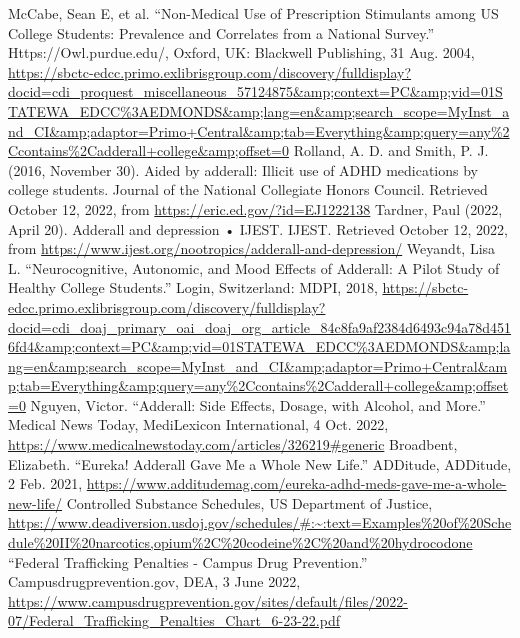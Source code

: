 \documentclass{article}
\begin{document}
\begin{thebibliography}{}
                McCabe, Sean E, et al. “Non-Medical Use of Prescription Stimulants among US College Students: Prevalence and Correlates from a National Survey.” Https://Owl.purdue.edu/, Oxford, UK: Blackwell Publishing, 31 Aug. 2004, \url{https://sbctc-edcc.primo.exlibrisgroup.com/discovery/fulldisplay?docid=cdi_proquest_miscellaneous_57124875&amp;context=PC&amp;vid=01STATEWA_EDCC%3AEDMONDS&amp;lang=en&amp;search_scope=MyInst_and_CI&amp;adaptor=Primo+Central&amp;tab=Everything&amp;query=any%2Ccontains%2Cadderall+college&amp;offset=0}
                Rolland, A. D. and Smith, P. J. (2016, November 30). Aided by adderall: Illicit use of ADHD medications by college students. Journal of the National Collegiate Honors Council. Retrieved October 12, 2022, from \url{https://eric.ed.gov/?id=EJ1222138}
                Tardner, Paul (2022, April 20). Adderall and depression • IJEST. IJEST. Retrieved October 12, 2022, from \url{https://www.ijest.org/nootropics/adderall-and-depression/}
                Weyandt, Lisa L. “Neurocognitive, Autonomic, and Mood Effects of Adderall: A Pilot Study of Healthy College Students.” Login, Switzerland: MDPI, 2018, \url{https://sbctc-edcc.primo.exlibrisgroup.com/discovery/fulldisplay?docid=cdi_doaj_primary_oai_doaj_org_article_84c8fa9af2384d6493c94a78d4516fd4&amp;context=PC&amp;vid=01STATEWA_EDCC%3AEDMONDS&amp;lang=en&amp;search_scope=MyInst_and_CI&amp;adaptor=Primo+Central&amp;tab=Everything&amp;query=any%2Ccontains%2Cadderall+college&amp;offset=0}  
                Nguyen, Victor. “Adderall: Side Effects, Dosage, with Alcohol, and More.” Medical News Today, MediLexicon International, 4 Oct. 2022, \url{https://www.medicalnewstoday.com/articles/326219#generic}
                Broadbent, Elizabeth. “Eureka! Adderall Gave Me a Whole New Life.” ADDitude, ADDitude, 2 Feb. 2021, \url{https://www.additudemag.com/eureka-adhd-meds-gave-me-a-whole-new-life/}
                Controlled Substance Schedules, US Department of Justice, \url{https://www.deadiversion.usdoj.gov/schedules/#:~:text=Examples%20of%20Schedule%20II%20narcotics,opium%2C%20codeine%2C%20and%20hydrocodone}
                “Federal Trafficking Penalties - Campus Drug Prevention.” Campusdrugprevention.gov, DEA, 3 June 2022, \url{https://www.campusdrugprevention.gov/sites/default/files/2022-07/Federal_Trafficking_Penalties_Chart_6-23-22.pdf}

\end{thebibliography}
\end{document}

